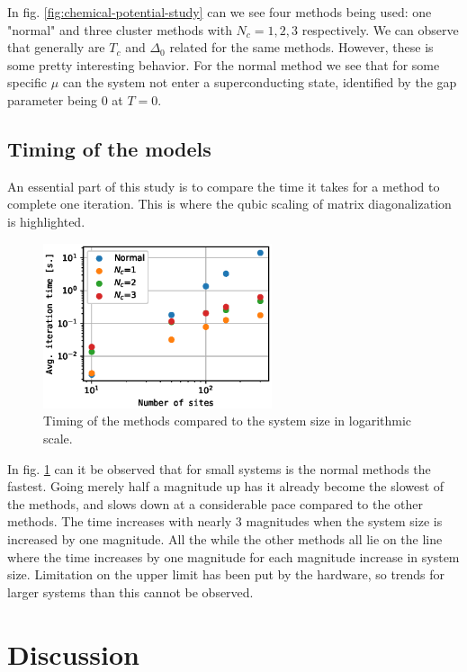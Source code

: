 \documentclass[11pt]{article}
\begin{document}
In fig. \ref{fig:chemical-potential-study} can we see four methods being used: one "normal" and three cluster methods with $N_c = 1, 2, 3$ respectively. We can observe that generally are $T_c$ and $\Delta_0$ related for the same methods. However, these is some pretty interesting behavior. For the normal method we see that for some specific $\mu$ can the system not enter a superconducting state, identified by the gap parameter being 0 at $T=0$. 


\subsection{Timing of the models}

An essential part of this study is to compare the time it takes for a method to complete one iteration. This is where the qubic scaling of matrix diagonalization is highlighted. 

\begin{figure}[ht]
	\centering
	\includegraphics[width=0.6\textwidth]{figures/timing_plot}
	\caption{Timing of the methods compared to the system size in logarithmic scale. }
	\label{fig:timing_comp}
\end{figure}

In fig. \ref{fig:timing_comp} can it be observed that for small systems is the normal methods the fastest. Going merely half a magnitude up has it already become the slowest of the methods, and slows down at a considerable pace compared to the other methods. The time increases with nearly 3 magnitudes when the system size is increased by one magnitude. All the while the other methods all lie on the line where the time increases by one magnitude for each magnitude increase in system size. Limitation on the upper limit has been put by the hardware, so trends for larger systems than this cannot be observed. 

\section{Discussion}\label{sec:discussion}


\onecolumn
\end{document}
